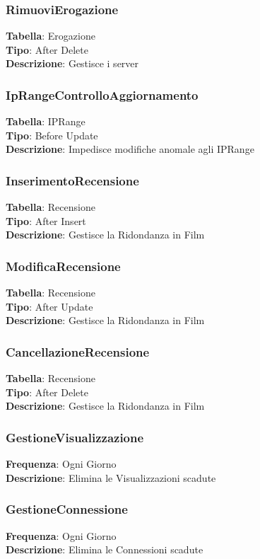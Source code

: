 \documentclass{article}
\begin{document}
\subsubsection{RimuoviErogazione}
\textbf{Tabella}: Erogazione \\
\textbf{Tipo}: After Delete \\
\textbf{Descrizione}: Gestisce i server \\
\subsubsection{IpRangeControlloAggiornamento}
\textbf{Tabella}: IPRange\\
\textbf{Tipo}: Before Update\\
\textbf{Descrizione}: Impedisce modifiche anomale agli IPRange \\
\subsubsection{InserimentoRecensione}
\textbf{Tabella}: Recensione \\
\textbf{Tipo}: After Insert \\
\textbf{Descrizione}: Gestisce la Ridondanza in Film \\
\subsubsection{ModificaRecensione}
\textbf{Tabella}: Recensione \\
\textbf{Tipo}: After Update \\
\textbf{Descrizione}: Gestisce la Ridondanza in Film \\
\subsubsection{CancellazioneRecensione}
\textbf{Tabella}: Recensione \\
\textbf{Tipo}: After Delete \\
\textbf{Descrizione}: Gestisce la Ridondanza in Film \\
\subsubsection{GestioneVisualizzazione}
\textbf{Frequenza}: Ogni Giorno \\
\textbf{Descrizione}: Elimina le Visualizzazioni scadute \\
\subsubsection{GestioneConnessione}
\textbf{Frequenza}: Ogni Giorno \\
\textbf{Descrizione}: Elimina le Connessioni scadute \\
\end{document}

